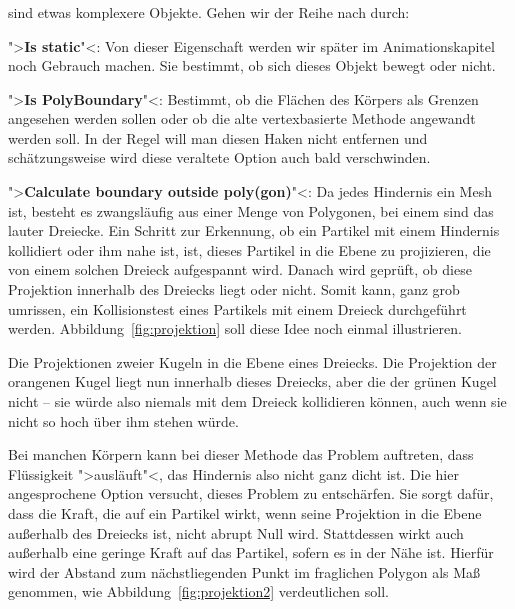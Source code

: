 \documentclass[10pt,DIV=14,a4paper]{scrartcl}
\begin{document}
\itE

\subsubsection{}
 sind etwas komplexere Objekte. Gehen wir der Reihe
nach durch:

\itA
	\item ">\textbf{Is static}"<: Von dieser Eigenschaft werden wir
	später im Animationskapitel noch Gebrauch machen. Sie bestimmt, ob
	sich dieses Objekt bewegt oder nicht.

	\item ">\textbf{Is PolyBoundary}"<: Bestimmt, ob die Flächen des
	Körpers als Grenzen angesehen werden sollen oder ob die alte
	vertexbasierte Methode angewandt werden soll. In der Regel will man
	diesen Haken nicht entfernen und schätzungsweise wird diese
	veraltete Option auch bald verschwinden.

	\item ">\textbf{Calculate boundary outside poly(gon)}"<: Da jedes
	Hindernis ein Mesh ist, besteht es zwangsläufig aus einer Menge von
	Polygonen, bei einem \TriMesh sind das lauter Dreiecke. Ein Schritt
	zur Erkennung, ob ein Partikel mit einem Hindernis kollidiert oder
	ihm nahe ist, ist, dieses Partikel in die Ebene zu projizieren, die
	von einem solchen Dreieck aufgespannt wird. Danach wird geprüft, ob
	diese Projektion innerhalb des Dreiecks liegt oder nicht. Somit
	kann, ganz grob umrissen, ein Kollisionstest eines Partikels mit
	einem Dreieck durchgeführt werden. Abbildung~\ref{fig:projektion}
	soll diese Idee noch einmal illustrieren.

	{Die Projektionen zweier Kugeln in die Ebene eines Dreiecks. Die
	Projektion der orangenen Kugel liegt nun innerhalb dieses Dreiecks,
	aber die der grünen Kugel nicht -- sie würde also niemals mit dem
	Dreieck kollidieren können, auch wenn sie nicht so hoch über ihm
	stehen würde.}

	Bei manchen Körpern kann bei dieser Methode das Problem auftreten,
	dass Flüssigkeit ">ausläuft"<, das Hindernis also nicht ganz dicht
	ist. Die hier angesprochene Option versucht, dieses Problem zu
	entschärfen. Sie sorgt dafür, dass die Kraft, die auf ein Partikel
	wirkt, wenn seine Projektion in die Ebene außerhalb des Dreiecks
	ist, nicht abrupt Null wird. Stattdessen wirkt auch außerhalb eine
	geringe Kraft auf das Partikel, sofern es in der Nähe ist. Hierfür
	wird der Abstand zum nächstliegenden Punkt im fraglichen Polygon als
	Maß genommen, wie Abbildung~\ref{fig:projektion2} verdeutlichen
	soll.
\end{document}
